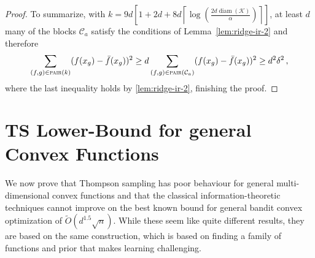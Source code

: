 \documentclass[letter, 12pt]{report}
\newcommand{\ceil}[1]{\left\lceil #1 \right\rceil}
\newcommand{\pair}{\operatorname{\textsc{pair}}}
\newcommand{\cK}{\mathcal K}
\newcommand{\cC}{\mathcal C}
\newcommand{\diam}{\operatorname{diam}}
\newcommand{\1}{\mathbf{1}}
\newcommand{\ts}{\textsc{TS}\xspace}
\theoremstyle{plain}
\theoremstyle{definition}
\theoremstyle{remark}
\begin{document}
\begin{proof}
    To summarize, with $k = 9d\left[1 + 2d + 8d\ceil{\log\left(\frac{2d \diam(\cK)}{\alpha}\right)}\right]$,
    at least $d$ many of the blocks $\cC_a$ satisfy the conditions of Lemma~\ref{lem:ridge-ir-2} and therefore
    \begin{align*}
        \sum_{(f,g) \in \pair(k)} (f(x_g) - \bar f(x_g))^2
        \geq d \sum_{(f,g) \in \pair(\cC_a)} (f(x_g) - \bar f(x_g))^2
        \geq d^2 \delta^2\,,
    \end{align*}
    where the last inequality holds by \cref{lem:ridge-ir-2}, finishing the proof.
\end{proof}

\chapter{\ts Lower-Bound for general Convex Functions}
\label{chp:ts-lower-proof}
We now prove that
Thompson sampling has poor behaviour for general multi-dimensional convex functions and
that the classical information-theoretic techniques cannot improve on the best known bound for general bandit convex optimization
of $\tilde O(d^{1.5} \sqrt{n})$. While these seem like quite different results, they are based on the same construction, which is
based on finding a family of functions and prior that makes learning challenging.
\end{document}
